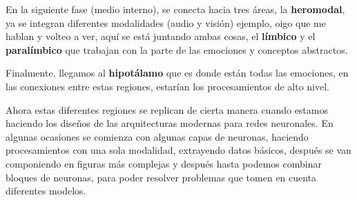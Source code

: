 En la siguiente fase (medio interno), se conecta hacia tres áreas, la \textbf{heromodal}, ya se integran diferentes modalidades (audio y visión) ejemplo, oigo que me hablan y volteo a ver, aquí se está juntando ambas cosas, el \textbf{límbico} y el \textbf{paralímbico} que trabajan con la parte de las emociones y conceptos abstractos.


Finalmente, llegamos al \textbf{hipotálamo} que es donde están todas las emociones, en las conexiones entre estas regiones, estarían los procesamientos de alto nivel.


Ahora estas diferentes regiones se replican de cierta manera cuando estamos haciendo los diseños de las arquitecturas modernas para redes neuronales.
En algunas ocasiones se comienza con algunas capas de neuronas, haciendo procesamientos con una sola modalidad, extrayendo datos básicos, después se van
componiendo en figuras más complejas y después hasta podemos combinar bloques de neuronas, para poder resolver problemas que tomen en cuenta diferentes modelos.






